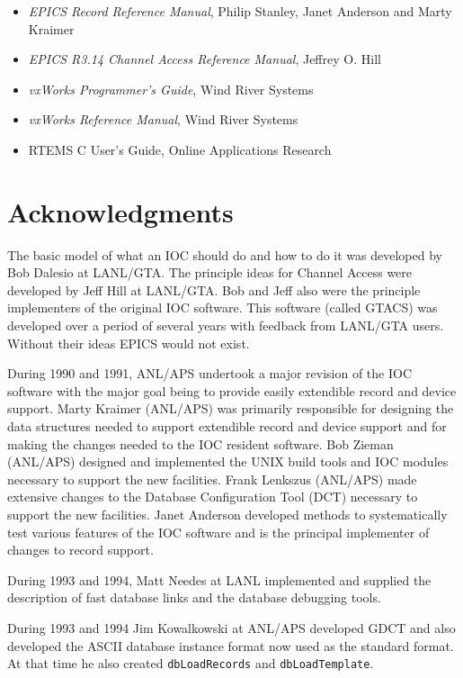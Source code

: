 \begin{itemize}
\item \emph{EPICS Record Reference Manual}, Philip Stanley, Janet Anderson and Marty Kraimer

\item \emph{EPICS R3.14 Channel Access Reference Manual}, Jeffrey O. Hill

\item \emph{vxWorks Programmer's Guide}, Wind River Systems

\item \emph{vxWorks Reference Manual}, Wind River Systems

\item RTEMS C User's Guide, Online Applications Research

\end{itemize}

\section{Acknowledgments}

The basic model of what an IOC should do and how to do it was developed by Bob Dalesio at LANL/GTA. The principle 
ideas for Channel Access were developed by Jeff Hill at LANL/GTA. Bob and Jeff also were the principle implementers 
of the original IOC software. This software (called GTACS) was developed over a period of several years with feedback 
from LANL/GTA users. Without their ideas EPICS would not exist.

During 1990 and 1991, ANL/APS undertook a major revision of the IOC software with the major goal being to provide 
easily extendible record and device support. Marty Kraimer (ANL/APS) was primarily responsible for designing the data 
structures needed to support extendible record and device support and for making the changes needed to the IOC resident 
software. Bob Zieman (ANL/APS) designed and implemented the UNIX build tools and IOC modules necessary to 
support the new facilities. Frank Lenkszus (ANL/APS) made extensive changes to the Database Configuration Tool 
(DCT) necessary to support the new facilities. Janet Anderson developed methods to systematically test various features 
of the IOC software and is the principal implementer of changes to record support.

During 1993 and 1994, Matt Needes at LANL implemented and supplied the description of fast database links and the 
database debugging tools.

During 1993 and 1994 Jim Kowalkowski at ANL/APS developed GDCT and also developed the ASCII database instance 
format now used as the standard format. At that time he also created \verb|dbLoadRecords| and \verb|dbLoadTemplate|.

